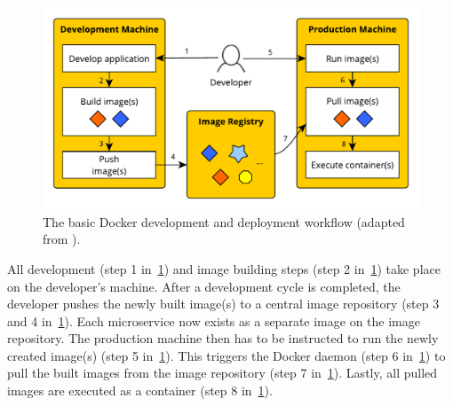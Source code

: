 \begin{figure}[H]
\begin{center}
  \includegraphics[scale=0.7]{images/figures/docker_workflow.pdf}
\end{center}
\caption[The basic Docker development and deployment workflow.]{The basic Docker development and deployment workflow (adapted from \autocite[Fig. 1.6]{LuksaKubernetesAction2017}).}
\label{fig:docker_workflow}
\end{figure}

All development (step 1 in~\ref{fig:docker_workflow}) and image building steps
(step 2 in~\ref{fig:docker_workflow}) take place on the developer's machine.
After a development cycle is completed, the developer pushes the newly built
image(s) to a central image repository (step 3 and 4
in~\ref{fig:docker_workflow}). Each microservice now exists as a separate image
on the image repository. The production machine then has to be instructed to
run the newly created image(s) (step 5 in~\ref{fig:docker_workflow}). This
triggers the Docker daemon (step 6 in~\ref{fig:docker_workflow}) to pull the
built images from the image repository (step 7 in~\ref{fig:docker_workflow}).
Lastly, all pulled images are executed as a container (step 8
in~\ref{fig:docker_workflow}).

